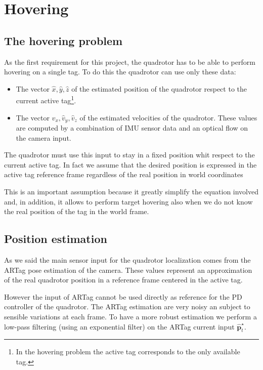 \section{Hovering}

\subsection{The hovering problem}

As the first requirement for this project, the quadrotor has to be able to
perform hovering on a single tag. To do this the quadrotor can use only these
data:

\begin{itemize} 
    \item The vector $\hat{x},\hat{y},\hat{z}$ of the estimated position of the
        quadrotor respect to the current active tag\footnote{In the hovering
        problem the active tag corresponds to the only available tag.}.
    \item The vector $\hat{v}_x, \hat{v}_y, \hat{v}_z$ of the estimated
        velocities of the quadrotor. These values are computed by a combination
        of IMU sensor data and an optical flow on the camera input.
\end{itemize}

The quadrotor must use this input to stay in a fixed position whit respect to the
current active tag. In fact we assume that the desired position is expressed in
the active tag reference frame regardless of the real position in world
coordinates 

This is an important assumption because it greatly simplify the equation
involved and, in addition, it allows to perform target hovering also when we do
not know the real position of the tag in the world frame.

\subsection{Position estimation}

As we said the main sensor input for the quadrotor localization comes from the
ARTag pose estimation of the camera. These values represent an approximation
of the real quadrotor position in a reference frame centered in the active tag.

However the input of ARTag cannot be used directly as reference for the PD
controller of the quadrotor. The ARTag estimation are very noisy an subject to
sensible variations at each frame. To have a more robust estimation we perform a 
low-pass filtering (using an exponential filter) on the ARTag current input
$\hat{\boldsymbol{p}}^{\star}_{t}$.


